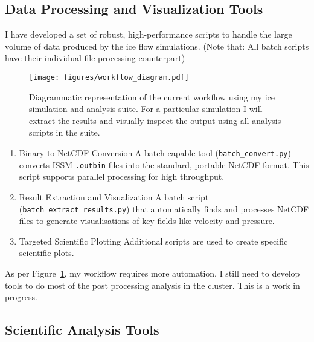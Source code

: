 \subsection{Data Processing and Visualization Tools}\label{dataviz}
I have developed a set of robust, high-performance scripts to handle the large volume of data produced by the ice flow simulations. (Note that: All batch scripts have their individual file processing counterpart)
\begin{figure}[H]
    \texttt{[image: figures/workflow\_diagram.pdf]}
    \caption{Diagrammatic representation of the current workflow using my ice simulation and analysis suite. For a particular simulation I will extract the results and visually inspect the output using  all analysis scripts in the suite.}
    \label{fig:workflow}
\end{figure}
\begin{enumerate}
\item{Binary to NetCDF Conversion} A batch-capable tool (\texttt{batch\_convert.py}) converts ISSM \texttt{.outbin} files into the standard, portable NetCDF format. This script supports parallel processing for high throughput.
\item{Result Extraction and Visualization} A batch script (\texttt{batch\_extract\_results.py}) that automatically finds and processes NetCDF files to generate visualisations of key fields like velocity and pressure. 
\item{Targeted Scientific Plotting} Additional scripts are used to create specific scientific plots.
\end{enumerate}
As per Figure~\ref{fig:workflow}, my workflow requires more automation. I still need to develop tools to do most of the post processing analysis in the cluster. This is  a work in progress.

\subsection{Scientific Analysis Tools} 

